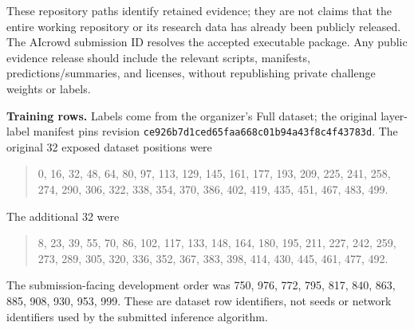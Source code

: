 These repository paths identify retained evidence; they are not claims that
the entire working repository or its research data has already been publicly
released. The AIcrowd submission ID resolves the accepted executable package.
Any public evidence release should include the relevant scripts, manifests,
predictions/summaries, and licenses, without republishing private challenge
weights or labels.

\textbf{Training rows.} Labels come from the organizer's
 Full dataset; the original layer-label
manifest pins revision \texttt{ce926b7d1ced65faa668c01b94a43f8c4f43783d}.
The original 32 exposed dataset positions were
\begin{quote}\small
0, 16, 32, 48, 64, 80, 97, 113, 129, 145, 161, 177, 193, 209, 225, 241,
258, 274, 290, 306, 322, 338, 354, 370, 386, 402, 419, 435, 451, 467, 483, 499.
\end{quote}
The additional 32 were
\begin{quote}\small
8, 23, 39, 55, 70, 86, 102, 117, 133, 148, 164, 180, 195, 211, 227, 242,
259, 273, 289, 305, 320, 336, 352, 367, 383, 398, 414, 430, 445, 461, 477, 492.
\end{quote}
The submission-facing development order was 750, 976, 772, 795, 817, 840,
863, 885, 908, 930, 953, 999. These are dataset row identifiers, not seeds or
network identifiers used by the submitted inference algorithm.
